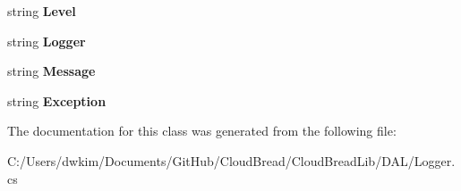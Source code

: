 \begin{DoxyCompactItemize}
\item 
string {\bfseries Level}\hypertarget{a00044_a1d48ff9647c2c2ae0663cc518064fa5f}{}\label{a00044_a1d48ff9647c2c2ae0663cc518064fa5f}

\item 
string {\bfseries Logger}\hypertarget{a00044_a1985d8f6e35a4092ee08241c932192d7}{}\label{a00044_a1985d8f6e35a4092ee08241c932192d7}

\item 
string {\bfseries Message}\hypertarget{a00044_a731b50713ec4b57fdaf89572ee8ac35b}{}\label{a00044_a731b50713ec4b57fdaf89572ee8ac35b}

\item 
string {\bfseries Exception}\hypertarget{a00044_aaa8a8162d82c557946d48b03aa40a959}{}\label{a00044_aaa8a8162d82c557946d48b03aa40a959}

\end{DoxyCompactItemize}


The documentation for this class was generated from the following file\+:\begin{DoxyCompactItemize}
\item 
C\+:/\+Users/dwkim/\+Documents/\+Git\+Hub/\+Cloud\+Bread/\+Cloud\+Bread\+Lib/\+D\+A\+L/Logger.\+cs\end{DoxyCompactItemize}
